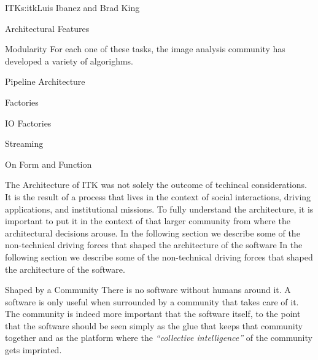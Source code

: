 \begin{aosachapter}{ITK}{s:itk}{Luis Ibanez and Brad King}
\begin{aosasect1}{Architectural Features}
\begin{aosasect2}{Modularity}
For each one of these tasks, the image analysis community has developed a
variety of algorighms.


\end{aosasect2}

\begin{aosasect2}{Pipeline Architecture}
\end{aosasect2}

\begin{aosasect2}{Factories}
\end{aosasect2}

\begin{aosasect2}{IO Factories}
\end{aosasect2}

\begin{aosasect2}{Streaming}
\end{aosasect2}

\end{aosasect1}

\begin{aosasect1}{On Form and Function}

The Architecture of ITK was not solely the outcome of techincal
considerations. It is the result of a process that lives in the
context of social interactions, driving applications, and
institutional missions. To fully understand the architecture, it is
important to put it in the context of that larger community from where
the architectural decisions arouse. In the following section we
describe some of the non-technical driving forces that shaped the
architecture of the software In the following section we describe some
of the non-technical driving forces that shaped the architecture of
the software.

\begin{aosasect2}{Shaped by a Community}
There is no software without humans around it. A software is only
useful when surrounded by a community that takes care of it. The
community is indeed more important that the software itself, to the
point that the software should be seen simply as the glue that keeps
that community together and as the platform where the \emph{``collective
intelligence''} of the community gets imprinted.
\end{aosasect2}


\end{aosasect1}
\end{aosachapter}
